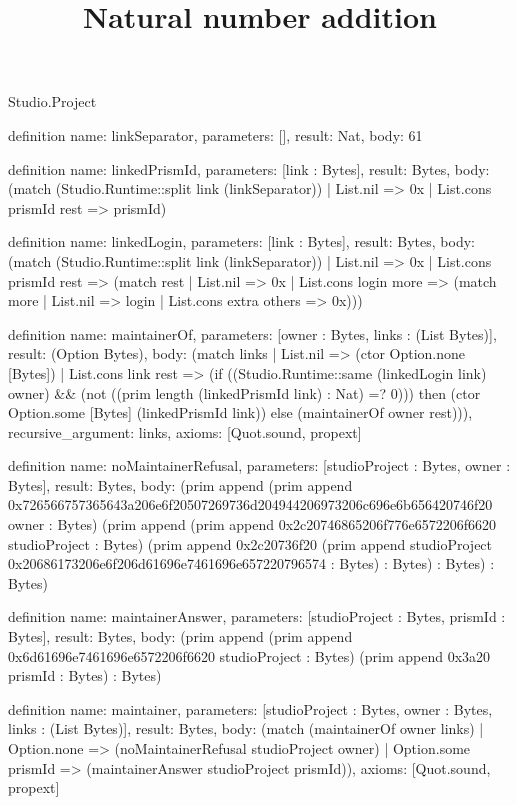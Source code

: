 \begin{lexlean}{Studio.Project}
\title{Natural number addition}
\begin{semanticmodule}
definition{
  name: linkSeparator,
  parameters: [],
  result: Nat,
  body: 61
}

definition{
  name: linkedPrismId,
  parameters: [link : Bytes],
  result: Bytes,
  body: (match (Studio.Runtime::split link (linkSeparator))
    | List.nil => 0x
    | List.cons prismId rest => prismId)
}

definition{
  name: linkedLogin,
  parameters: [link : Bytes],
  result: Bytes,
  body: (match (Studio.Runtime::split link (linkSeparator))
    | List.nil => 0x
    | List.cons prismId rest => (match rest
      | List.nil => 0x
      | List.cons login more => (match more
        | List.nil => login
        | List.cons extra others => 0x)))
}

definition{
  name: maintainerOf,
  parameters: [owner : Bytes, links : (List Bytes)],
  result: (Option Bytes),
  body: (match links
    | List.nil => (ctor Option.none [Bytes])
    | List.cons link rest => (if ((Studio.Runtime::same (linkedLogin link) owner) && (not ((prim length (linkedPrismId link) : Nat) =? 0))) then (ctor Option.some [Bytes] (linkedPrismId link)) else (maintainerOf owner rest))),
  recursive_argument: links,
  axioms: [Quot.sound, propext]
}

definition{
  name: noMaintainerRefusal,
  parameters: [studioProject : Bytes, owner : Bytes],
  result: Bytes,
  body: (prim append (prim append 0x726566757365643a206e6f20507269736d204944206973206c696e6b656420746f20 owner : Bytes) (prim append (prim append 0x2c20746865206f776e6572206f6620 studioProject : Bytes) (prim append 0x2c20736f20 (prim append studioProject 0x20686173206e6f206d61696e7461696e657220796574 : Bytes) : Bytes) : Bytes) : Bytes)
}

definition{
  name: maintainerAnswer,
  parameters: [studioProject : Bytes, prismId : Bytes],
  result: Bytes,
  body: (prim append (prim append 0x6d61696e7461696e6572206f6620 studioProject : Bytes) (prim append 0x3a20 prismId : Bytes) : Bytes)
}

definition{
  name: maintainer,
  parameters: [studioProject : Bytes, owner : Bytes, links : (List Bytes)],
  result: Bytes,
  body: (match (maintainerOf owner links)
    | Option.none => (noMaintainerRefusal studioProject owner)
    | Option.some prismId => (maintainerAnswer studioProject prismId)),
  axioms: [Quot.sound, propext]
}


\end{semanticmodule}
\end{lexlean}
